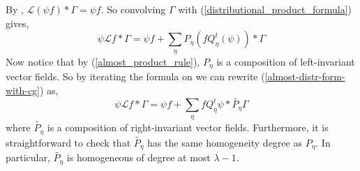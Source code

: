 \documentclass[12pt,a4paper,reqno]{amsart}
\newcommand{\wt}{\widetilde}
\newcommand{\cg}{\Gamma}
\renewcommand{\L}{\mathcal{L}}
\renewcommand{\l}{\lambda}
\numberwithin{equation}{section}
\theoremstyle{definition}
\begin{document}
By \cite[Corollary 2.8]{Fo}, $\L(\psi f) \ast \cg = \psi f$. So convolving $\cg$ with (\ref{distributional_product_formula}) gives, \begin{equation}\label{almost-distr-form-with-cg}
\psi \L f \ast \cg = \psi f + \sum_{\eta} P_{\eta}(f Q_{\eta}^t(\psi)) \ast \cg    
\end{equation}
Now notice that by (\ref{almost_product_rule}), $P_{\eta}$ is a composition of left-invariant vector fields. So by iterating the formula on \cite[Page 31]{FR} we can rewrite (\ref{almost-distr-form-with-cg}) as, \begin{equation}\label{distr-form-cg}
 \psi \L f \ast \cg = \psi f + \sum_{\eta} fQ_{\eta}^t \psi \ast \wt{P_{\eta}}\cg
\end{equation}
where $\wt{P_{\eta}}$ is a composition of right-invariant vector fields. Furthermore, it is straightforward to check that $\wt{P_{\eta}}$ has the same homogeneity degree as $P_{\eta}$. In particular, $\wt{P_{\eta}}$ is homogeneous of degree at most $\l-1$. 
\end{document}

